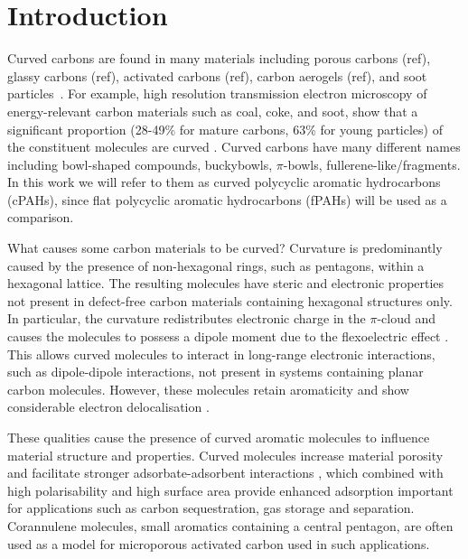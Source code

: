 %
\section{Introduction}
\label{sec:Introduction}

Curved carbons are found in many materials including porous carbons (ref), glassy carbons (ref), activated carbons (ref), carbon aerogels (ref), and soot particles~\cite{Martin2018flexo}. For example, high resolution transmission electron microscopy of energy-relevant carbon materials such as coal, coke, and soot, show that a significant proportion (28-49\% for mature carbons, 63\% for young particles) of the constituent molecules are curved \cite{wang2017improved,zhong2018structural,Martin2018flexo}. 
Curved carbons have many different names including bowl-shaped compounds, buckybowls, $\pi$-bowls, fullerene-like/fragments. In this work we will refer to them as curved polycyclic aromatic hydrocarbons (cPAHs), since flat polycyclic aromatic hydrocarbons (fPAHs) will be used as a comparison.

What causes some carbon materials to be curved? Curvature is predominantly caused by the presence of non-hexagonal rings, such as pentagons, within a hexagonal lattice. The resulting molecules have steric and electronic properties not present in defect-free carbon materials containing hexagonal structures only. In particular, the curvature redistributes electronic charge in the $\pi$-cloud and causes the molecules to possess a dipole moment due to the flexoelectric effect \cite{Martin2017}. This allows curved molecules to interact in long-range electronic interactions, such as dipole-dipole interactions, not present in systems containing planar carbon molecules. However, these molecules retain aromaticity and show considerable electron delocalisation \cite{grabowsky2010electron}.

These qualities cause the presence of curved aromatic molecules to influence material structure and properties. Curved molecules increase material porosity \cite{zhang2020molecular} and facilitate stronger adsorbate-adsorbent interactions \cite{demir2016adsorption}, which combined with high polarisability and high surface area provide enhanced adsorption important for applications such as carbon sequestration, gas storage and separation. Corannulene molecules, small aromatics containing a central pentagon, are often used as a model for microporous activated carbon \cite{demir2016adsorption,li2020molecular} used in such applications.

